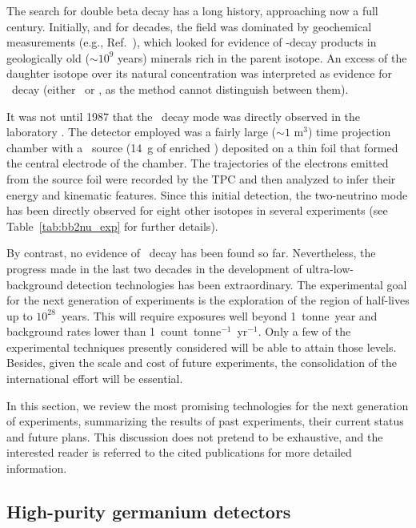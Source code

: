 The search for double beta decay has a long history, approaching now a full century. Initially, and for decades, the field was dominated by geochemical measurements (e.g., Ref.~\cite{Inghram:1950qv}), which looked for evidence of \bb-decay products in geologically old ($\sim 10^9$ years) minerals rich in the parent isotope. An excess of the daughter isotope over its natural concentration was interpreted as evidence for \bb\ decay (either \bbtnu\ or \bbonu, as the method cannot distinguish between them). 

It was not until 1987 that the \bbtnu\ decay mode was directly observed in the laboratory \cite{Elliott:1987kp,Moe:2014ioa}. The detector employed was a fairly large ($\sim1$ m$^{3}$) time projection chamber with a \bb\ source (14~g of enriched ) deposited on a thin foil that formed the central electrode of the chamber. The trajectories of the electrons emitted from the source foil were recorded by the TPC and then analyzed to infer their energy and kinematic features. Since this initial detection, the two-neutrino mode has been directly observed for eight other isotopes in several experiments (see Table~\ref{tab:bb2nu_exp} for further details).

By contrast, no evidence of \bbonu\ decay has been found so far. Nevertheless, the progress made in the last two decades in the development of ultra-low-background detection technologies has been extraordinary. The experimental goal for the next generation of experiments is the exploration of the region of half-lives up to $10^{28}$~years. This will require exposures well beyond 1~tonne~year and background rates lower than 1~count~tonne$^{-1}$~yr$^{-1}$. Only a few of the experimental techniques presently considered will be able to attain those levels. Besides, given the scale and cost of future experiments, the consolidation of the international effort will be essential.

In this section, we review the most promising technologies for the next generation of experiments, summarizing the results of past experiments, their current status and future plans. This discussion does not pretend to be exhaustive, and the interested reader is referred to the cited publications for more detailed information.

\subsection{High-purity germanium detectors} 
\label{subsec:hpge}


